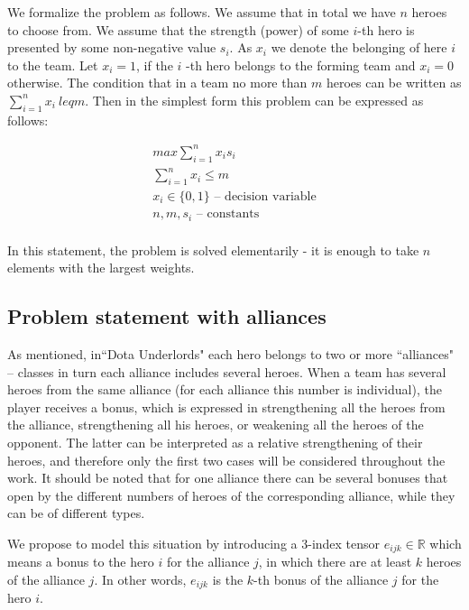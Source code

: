\documentclass{article}
\begin{document}
We formalize the problem as follows. We assume that in total we have $n$ heroes to choose from. We assume that the strength (power) of some $i$-th hero is presented by some non-negative value $s_i$. As $x_i$ we denote the  belonging of here $i$ to the team. Let $ x_i = 1 $, if the $ i $ -th hero belongs to the forming team and $ x_i = 0 $ otherwise. The condition that in a team no more than $m$  heroes can be written as $ \sum_{i=1}^n x_i \ leq m $. Then in the simplest form this problem can be expressed as follows:

\begin{equation}
\begin{gathered}
    max \sum_{i=1}^n x_i s_i \\
    \sum_{i=1}^n x_i \leq m \\
    x_i \in \{0, 1\} \text{ – decision variable} \\
   n, m, s_i \text{ – constants}  \\
\end{gathered}
\end{equation}


In this statement, the problem is solved elementarily - it is enough to take $ n $ elements with the largest weights.

\subsection{Problem statement with alliances}
As mentioned, in``Dota Underlords" each hero belongs to two or more ``alliances" -- classes in turn each alliance includes several heroes. When a team has several heroes from the same alliance (for each alliance this number is individual), the player receives a bonus, which is expressed in strengthening all the heroes from the alliance, strengthening all his heroes, or weakening all the heroes of the opponent. The latter can be interpreted as a relative strengthening of their heroes, and therefore only the first two cases will be considered throughout the work. It should be noted that for one alliance there can be several bonuses that open by the different numbers of heroes of the corresponding alliance, while they can be of different types.

We propose to model this situation by introducing a 3-index tensor $ e_{ijk} \in \mathbb{R} $ which means a bonus to the hero $i$ for the alliance $j$, in which there are at least $k$ heroes of the alliance $j$. In other words, $ e_{ijk} $ is the $k$-th bonus of the alliance $ j$ for the hero $i$.
\end{document}
